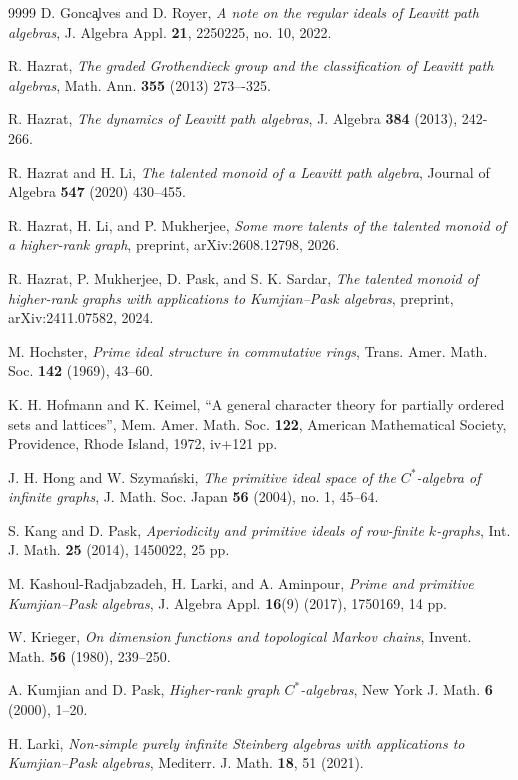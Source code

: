 \documentclass[a4paper,reqno,12pt]{amsart}
\numberwithin{equation}{section}
\theoremstyle{definition}
\theoremstyle{remark}
\begin{document}
\begin{thebibliography}{9999}
D. Gonc\c alves and D. Royer, \emph{A note on the regular ideals of Leavitt path algebras}, J. Algebra Appl. \textbf{21}, 2250225, no. 10, 2022. 

R. Hazrat, {\it The graded Grothendieck group and the classification of Leavitt path algebras}, Math. Ann. {\bf 355} (2013) 273–-325.

R. Hazrat, \emph{The dynamics of Leavitt path algebras}, J. Algebra \textbf{384} (2013), 242-266.

R. Hazrat and H. Li, \emph{The talented monoid of a Leavitt path algebra}, Journal of Algebra {\bf 547} (2020) 430--455.

R. Hazrat, H. Li, and P. Mukherjee, \emph{Some more talents of the talented monoid of a higher-rank graph}, preprint, arXiv:2608.12798, 2026.

R. Hazrat, P. Mukherjee, D. Pask, and S. K. Sardar, \emph{The talented monoid of higher-rank graphs with applications to Kumjian--Pask algebras}, preprint, arXiv:2411.07582, 2024.

M. Hochster, \emph{Prime ideal structure in commutative rings}, Trans. Amer. Math. Soc. \textbf{142} (1969), 43--60.

K. H. Hofmann and K. Keimel, ``A general character theory for partially ordered sets and lattices'', Mem. Amer. Math. Soc. \textbf{122}, American Mathematical Society, Providence, Rhode Island, 1972, iv+121 pp.

J. H. Hong and W. Szyma\'{n}ski, \emph{The primitive ideal space of the $C^*$-algebra of infinite graphs}, J. Math. Soc. Japan \textbf{56} (2004), no. 1, 45--64.

S. Kang and D. Pask, \emph{Aperiodicity and primitive ideals of row-finite $k$-graphs}, Int. J. Math. \textbf{25} (2014), 1450022, 25 pp.

M. Kashoul-Radjabzadeh, H. Larki, and A. Aminpour, \emph{Prime and primitive Kumjian--Pask algebras}, J. Algebra Appl. \textbf{16}(9) (2017), 1750169, 14 pp.

W. Krieger, \emph{On dimension functions and topological Markov chains}, Invent. Math. {\bf 56} (1980), 239--250.   

A. Kumjian and D. Pask, \emph{Higher-rank graph $C^*$-algebras}, New York J. Math. {\bf 6} (2000), 1--20.

H. Larki, \emph{Non-simple purely infinite Steinberg algebras with applications to Kumjian--Pask algebras}, Mediterr. J. Math. \textbf{18}, 51 (2021).


\end{thebibliography}
\end{document}
